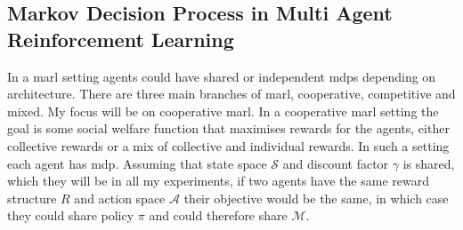 \documentclass[UKenglish]{uiomasterthesis}
\begin{document}
\subsection{Markov Decision Process in Multi Agent Reinforcement Learning}
In a \ac{marl} setting agents could have shared or independent \acp{mdp} depending on architecture. There are three main branches of \ac{marl}, cooperative, competitive and mixed. My focus will be on cooperative \ac{marl}.
In a cooperative \ac{marl} setting the goal is some social welfare function that maximises rewards for the agents, either collective rewards or a mix of collective and individual rewards. In such a setting each agent has \ac{mdp}. Assuming that state space \(\mathcal{S}\) and discount factor \(\gamma\) is shared, which they will be in all my experiments, if two agents have the same reward structure $R$ and action space \(\mathcal{A}\) their objective would be the same, in which case they could share policy \(\pi\) and could therefore share \(\mathcal{M}\).
\end{document}
